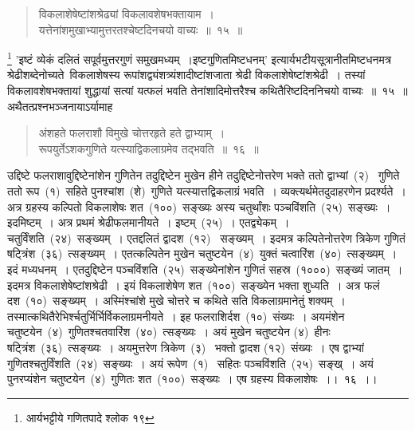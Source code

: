 \documentclass[11pt, openany]{book}
\begin{document}
\begin{quote}
{\ks विकलाशेषेष्टांशश्रेढ्यां विकलावशेषभक्तायाम~।\\
यत्तेनांशमुखाभ्यामुत्तरतश्चेष्टदिनचयो वाच्यः~॥~१५~॥}
\end{quote}

\indent
\renewcommand\thefootnote{*}\footnote{आर्यभट्टीये गणितपादे श्लोक १९} 'इष्टं व्येकं दलितं सपूर्वमुत्तरगुणं समुखमध्यम्~।इष्टगुणितमिष्टधनम्' इत्यार्यभटीयसूत्रानीतमिष्टधनमत्र श्रेढीशब्देनोच्यते\textendash\ विकलाशेषस्य रूपांशद्व्यंशत्र्यंशादीष्टांशजाता श्रेढी विकलाशेषेष्टांशश्रेढी~। तस्यां विकलावशेषभक्तायां शुद्धायां सत्यां यत्फलं भवति तेनांशादिमोत्तरैश्च कथितैरिष्टदिननिचयो वाच्यः~॥~१५~॥\\

\indent
अथैतत्प्रश्नभञ्जनायाऽर्यामाह\textendash

\begin{quote}
{\ks अंशहते फलराशौ विमुखे चोत्तरहृते हते द्वाभ्याम्~।\\
रूपयुर्तेऽशकगुणिते यत्स्याद्विकलाग्रमेव तद्भवति~॥~१६~॥}
\end{quote}

\indent
उद्दिष्टे फलराशावुद्दिष्टेनांशेन गुणितेन तदुद्दिष्टेन मुखेन हीने तदुद्दिष्टेनोत्तरेण भक्ते ततो द्वाभ्यां~(२)~ गुणिते ततो रूप~(१)~सहिते पुनश्चांश~(शे)~गुणिते यत्स्यात्तद्विकलाग्रं भवति~। व्यक्त्यर्थमेतदुदाहरणेन प्रदर्श्यते~। अत्र ग्रहस्य कल्पितो विकलाशेषः शत~(१००)~सङ्ख्यः अस्य चतुर्थांशः पञ्चविंशति~(२५)~सङ्ख्यः~। इदमिष्टम्~। अत्र प्रथमं श्रेढीफलमानीयते~। इष्टम्~(२५)~। एतद्व्येकम्~। चतुर्विंशति~(२४)~सङ्ख्यम्~। एतद्दलितं द्वादश~(१२)~ सङ्ख्यम्~। इदमत्र कल्पितेनोत्तरेण त्रिकेण गुणितं षट्त्रिंश~(३६)~त्सङ्ख्यम्~। एतत्कल्पितेन मुखेन चतुष्टयेन~(४)~युक्तं चत्वारिंश~(४०)~त्सङ्ख्यम्~। इदं मध्यधनम्~। एतदुद्दिष्टेन पञ्चविंशति~(२५)~सङ्ख्येनांशेन गुणितं सहस्र~(१०००)~सङ्ख्यं जातम्~। इदमत्र विकलाशेषेष्टांशश्रेढी~। इयं विकलाशेषेण शत~(१००)~सङ्ख्येन भक्ता शुध्यति~। अत्र फलं दश~(१०)~सङ्ख्यम्~। अस्मिंश्चांशे मुखे चोत्तरे च कथिते सति विकलाग्रमानेतुं शक्यम्~। तस्मात्कथितैरेभिर्श्चतुर्भिर्भिर्विकलाग्रमनीयते~। इह फलराशिर्दश~(१०)~संख्यः~। अयमंशेन चतुष्टयेन~(४)~गुणितश्चतवारिंश~(४०)~त्सङ्ख्यः~। अयं मुखेन चतुष्टयेन (४)~हीनः षट्त्रिंश~(३६)~त्सङ्ख्यः~। अयमुत्तरेण त्रिकेण~(३)~ भक्तो द्वादश (१२)~संख्यः~। एष द्वाभ्यां गुणितश्चतुर्विंशति~(२४)~सङ्ख्यः~। अयं रूपेण~(१)~ सहितः पञ्चविंशति~(२५)~सङ्ख्~। अयं पुनरप्यंशेन चतुष्टयेन~(४)~गुणितः शत~(१००)~सङ्ख्यः~। एष ग्रहस्य विकलाशेषः~।।~१६~।।


\newpage
\thispagestyle{fancy}
\fancyhf{}
\end{document}
